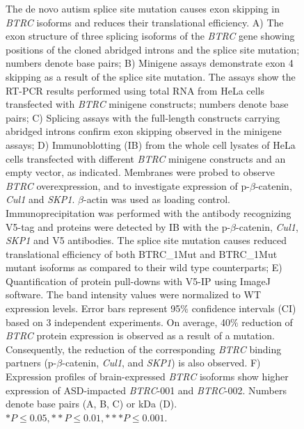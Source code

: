 \documentclass[12pt,chapterheads,final]{ucsd}
\begin{document}
\begin{figure}[h]
  \centering
  \caption[The de novo autism splice site mutation causes exon skipping in \textit{BTRC} isoforms and reduces their translational efficiency.]
{The de novo autism splice site mutation causes exon skipping in \textit{BTRC} isoforms and reduces their translational efficiency. A) The exon structure of three splicing isoforms of the \textit{BTRC} gene showing positions of the cloned abridged introns and the splice site mutation; numbers denote base pairs; B) Minigene assays demonstrate exon 4 skipping as a result of the splice site mutation. The assays show the RT-PCR results performed using total RNA from HeLa cells transfected with \textit{BTRC} minigene constructs; numbers denote base pairs; C) Splicing assays with the full-length constructs carrying abridged introns confirm exon skipping observed in the minigene assays; D) Immunoblotting (IB) from the whole cell lysates of HeLa cells transfected with different \textit{BTRC} minigene constructs and an empty vector, as indicated. Membranes were probed to observe \textit{BTRC} overexpression, and to investigate expression of p-$\beta$-catenin, \textit{Cul1} and \textit{SKP1}. $\beta$-actin was used as loading control. Immunoprecipitation was performed with the antibody recognizing V5-tag and proteins were detected by IB with the p-$\beta$-catenin, \textit{Cul1}, \textit{SKP1} and V5 antibodies. The splice site mutation causes reduced translational efficiency of both BTRC\_1Mut and BTRC\_1Mut mutant isoforms as compared to their wild type counterparts; E) Quantification of protein pull-downs with V5-IP using ImageJ software. The band intensity values were normalized to WT expression levels. Error bars represent 95$\%$ confidence intervals (CI) based on 3 independent experiments. On average, 40$\%$ reduction of \textit{BTRC} protein expression is observed as a result of a mutation. Consequently, the reduction of the corresponding \textit{BTRC} binding partners (p-$\beta$-catenin, \textit{Cul1}, and \textit{SKP1}) is also observed. F) Expression profiles of brain-expressed \textit{BTRC} isoforms show higher expression of ASD-impacted \textit{BTRC}-001 and \textit{BTRC}-002. Numbers denote base pairs (A, B, C) or kDa (D). $*P \leq 0.05, **P \leq 0.01, ***P \leq 0.001$.}
\end{figure}
\end{document}
